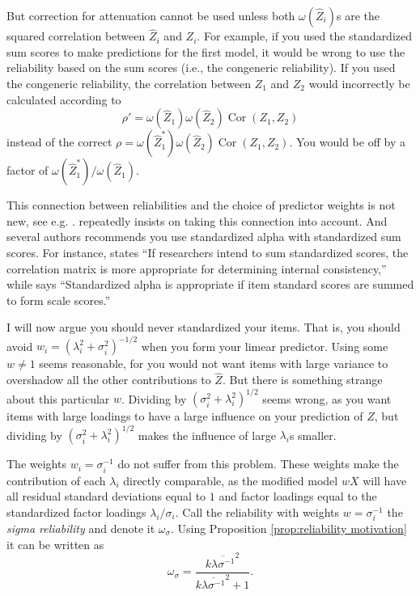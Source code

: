 \documentclass[twoside]{article}
\DeclareMathOperator{\Cor}{Cor}
\begin{document}
But correction for attenuation cannot be used unless both $\omega(\hat{Z}_i)$s are the squared correlation between $\hat{Z}_i$ and $Z_i$. For example, if you used the standardized sum scores to make predictions for the first model, it would be wrong to use the reliability based on the sum scores (i.e., the congeneric reliability). If you used the congeneric reliability, the correlation between $Z_1$ and $Z_2$ would incorrectly be calculated according to $$\rho'=\omega(\hat{Z}_{1})\omega(\hat{Z}_{2})\Cor(Z_{1},Z_{2})$$
instead of the correct $\rho=\omega(\hat{Z}_{1}^{*})\omega(\hat{Z}_{2})\Cor(Z_{1},Z_{2})$.
You would be off by a factor of $\omega(\hat{Z}_{1}^{*})/\omega(\hat{Z}_{1})$.

This connection between reliabilities and the choice of predictor
weights is not new, see e.g. \citep[][p. 112]{Joreskog1971-nn}. \citet{McNeish2018-vu} repeatedly insists on taking this connection into account. And several authors recommends you use standardized alpha with standardized sum scores. For instance, \citet[][p. 451]{Falk2011-ae} states \enquote{If researchers intend to sum
standardized scores, the correlation matrix is more appropriate for determining internal consistency,} while \citet[][p. 99]{Cortina1993-aq} says \enquote{Standardized alpha is appropriate if item standard scores are summed to form scale scores.}

I will now argue you should never standardized your items. That is, you should avoid $w_{i}=(\lambda_{i}^{2}+\sigma_{i}^{2})^{-1/2}$ when you form your limear predictor.
Using some $w\ne1$ seems reasonable, for you would not want items
with large variance to overshadow all the other contributions to $\hat{Z}$.
But there is something strange about this particular $w$. Dividing by $(\sigma_{i}^{2}+\lambda_{i}^{2})^{1/2}$
seems wrong, as you want items with large loadings to have a large
influence on your prediction of $Z$, but dividing by $(\sigma_{i}^{2}+\lambda_{i}^{2})^{1/2}$
makes the influence of large $\lambda_{i}$s smaller. 

The weights $w_i=\sigma_{i}^{-1}$ do not suffer from this problem. These weights make the contribution of each $\lambda_i$ directly comparable, as the modified model $wX$ will have all residual standard deviations equal to $1$ and factor loadings equal to the standardized factor loadings $\lambda_i/\sigma_i$. Call the reliability with weights $w=\sigma_{i}^{-1}$ the \emph{sigma reliability} and denote it $\omega_\sigma$. Using Proposition \ref{prop:reliability motivation} it can be written as
\begin{equation}
\omega_\sigma=\frac{k\overline{\lambda\sigma^{-1}}^{2}}{k\overline{\lambda\sigma^{-1}}^{2}+1}.\label{eq:Sigma-standardized reliability}
\end{equation}
\end{document}
